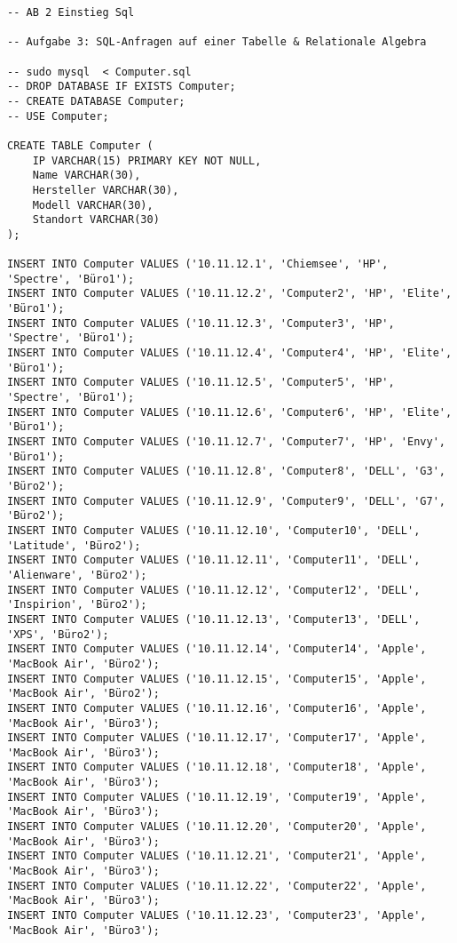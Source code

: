 \documentclass{lehramt-informatik-aufgabe}
\begin{document}
\begin{verbatim}
-- AB 2 Einstieg Sql

-- Aufgabe 3: SQL-Anfragen auf einer Tabelle & Relationale Algebra

-- sudo mysql  < Computer.sql
-- DROP DATABASE IF EXISTS Computer;
-- CREATE DATABASE Computer;
-- USE Computer;

CREATE TABLE Computer (
    IP VARCHAR(15) PRIMARY KEY NOT NULL,
    Name VARCHAR(30),
    Hersteller VARCHAR(30),
    Modell VARCHAR(30),
    Standort VARCHAR(30)
);

INSERT INTO Computer VALUES ('10.11.12.1', 'Chiemsee', 'HP', 'Spectre', 'Büro1');
INSERT INTO Computer VALUES ('10.11.12.2', 'Computer2', 'HP', 'Elite', 'Büro1');
INSERT INTO Computer VALUES ('10.11.12.3', 'Computer3', 'HP', 'Spectre', 'Büro1');
INSERT INTO Computer VALUES ('10.11.12.4', 'Computer4', 'HP', 'Elite', 'Büro1');
INSERT INTO Computer VALUES ('10.11.12.5', 'Computer5', 'HP', 'Spectre', 'Büro1');
INSERT INTO Computer VALUES ('10.11.12.6', 'Computer6', 'HP', 'Elite', 'Büro1');
INSERT INTO Computer VALUES ('10.11.12.7', 'Computer7', 'HP', 'Envy', 'Büro1');
INSERT INTO Computer VALUES ('10.11.12.8', 'Computer8', 'DELL', 'G3', 'Büro2');
INSERT INTO Computer VALUES ('10.11.12.9', 'Computer9', 'DELL', 'G7', 'Büro2');
INSERT INTO Computer VALUES ('10.11.12.10', 'Computer10', 'DELL', 'Latitude', 'Büro2');
INSERT INTO Computer VALUES ('10.11.12.11', 'Computer11', 'DELL', 'Alienware', 'Büro2');
INSERT INTO Computer VALUES ('10.11.12.12', 'Computer12', 'DELL', 'Inspirion', 'Büro2');
INSERT INTO Computer VALUES ('10.11.12.13', 'Computer13', 'DELL', 'XPS', 'Büro2');
INSERT INTO Computer VALUES ('10.11.12.14', 'Computer14', 'Apple', 'MacBook Air', 'Büro2');
INSERT INTO Computer VALUES ('10.11.12.15', 'Computer15', 'Apple', 'MacBook Air', 'Büro2');
INSERT INTO Computer VALUES ('10.11.12.16', 'Computer16', 'Apple', 'MacBook Air', 'Büro3');
INSERT INTO Computer VALUES ('10.11.12.17', 'Computer17', 'Apple', 'MacBook Air', 'Büro3');
INSERT INTO Computer VALUES ('10.11.12.18', 'Computer18', 'Apple', 'MacBook Air', 'Büro3');
INSERT INTO Computer VALUES ('10.11.12.19', 'Computer19', 'Apple', 'MacBook Air', 'Büro3');
INSERT INTO Computer VALUES ('10.11.12.20', 'Computer20', 'Apple', 'MacBook Air', 'Büro3');
INSERT INTO Computer VALUES ('10.11.12.21', 'Computer21', 'Apple', 'MacBook Air', 'Büro3');
INSERT INTO Computer VALUES ('10.11.12.22', 'Computer22', 'Apple', 'MacBook Air', 'Büro3');
INSERT INTO Computer VALUES ('10.11.12.23', 'Computer23', 'Apple', 'MacBook Air', 'Büro3');
\end{verbatim}
\end{document}
